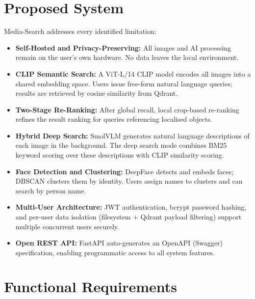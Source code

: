 \documentclass[12pt,a4paper,oneside]{report}
\begin{document}
\section{Proposed System}

Media-Search addresses every identified limitation:
\begin{itemize}[leftmargin=*]
  \item \textbf{Self-Hosted and Privacy-Preserving:} All images and AI
        processing remain on the user's own hardware. No data leaves
        the local environment.
  \item \textbf{CLIP Semantic Search:} A ViT-L/14 CLIP model encodes
        all images into a shared embedding space. Users issue free-form
        natural language queries; results are retrieved by cosine similarity
        from Qdrant.
  \item \textbf{Two-Stage Re-Ranking:} After global recall, local
        crop-based re-ranking refines the result ranking for queries
        referencing localised objects.
  \item \textbf{Hybrid Deep Search:} SmolVLM generates natural language
        descriptions of each image in the background. The deep search
        mode combines BM25 keyword scoring over these descriptions with
        CLIP similarity scoring.
  \item \textbf{Face Detection and Clustering:} DeepFace detects and embeds
        faces; DBSCAN clusters them by identity. Users assign names to
        clusters and can search by person name.
  \item \textbf{Multi-User Architecture:} JWT authentication, bcrypt
        password hashing, and per-user data isolation (filesystem + Qdrant
        payload filtering) support multiple concurrent users securely.
  \item \textbf{Open REST API:} FastAPI auto-generates an OpenAPI (Swagger)
        specification, enabling programmatic access to all system features.
\end{itemize}

\section{Functional Requirements}
\end{document}
